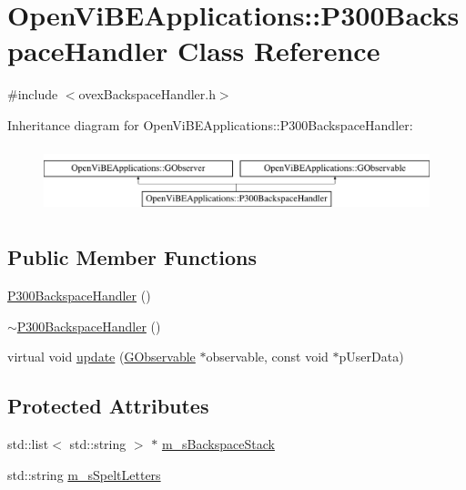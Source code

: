 \hypertarget{classOpenViBEApplications_1_1P300BackspaceHandler}{
\section{OpenViBEApplications::P300BackspaceHandler Class Reference}
\label{classOpenViBEApplications_1_1P300BackspaceHandler}
}


{\ttfamily \#include $<$ovexBackspaceHandler.h$>$}

Inheritance diagram for OpenViBEApplications::P300BackspaceHandler:\begin{figure}[H]
\begin{center}
\leavevmode
\includegraphics[height=1.931034cm]{classOpenViBEApplications_1_1P300BackspaceHandler}
\end{center}
\end{figure}
\subsection*{Public Member Functions}
\begin{DoxyCompactItemize}
\item 
\hyperlink{classOpenViBEApplications_1_1P300BackspaceHandler_ac772ff2a9fba5e3b64c9057d4b8f97e5}{P300BackspaceHandler} ()
\item 
\hyperlink{classOpenViBEApplications_1_1P300BackspaceHandler_a8889edef6e3fb72afe84120f2aa7bdc3}{$\sim$P300BackspaceHandler} ()
\item 
virtual void \hyperlink{classOpenViBEApplications_1_1P300BackspaceHandler_a9c5d97f6a9d86c0d1ac2cb2df2445b3f}{update} (\hyperlink{classOpenViBEApplications_1_1GObservable}{GObservable} $\ast$observable, const void $\ast$pUserData)
\end{DoxyCompactItemize}
\subsection*{Protected Attributes}
\begin{DoxyCompactItemize}
\item 
std::list$<$ std::string $>$ $\ast$ \hyperlink{classOpenViBEApplications_1_1P300BackspaceHandler_afa97ccc7a5dd74d19eaec79e18f14307}{m\_\-sBackspaceStack}
\item 
std::string \hyperlink{classOpenViBEApplications_1_1P300BackspaceHandler_a08f247f7d14bc9d476feb5748a3c0b82}{m\_\-sSpeltLetters}
\end{DoxyCompactItemize}


